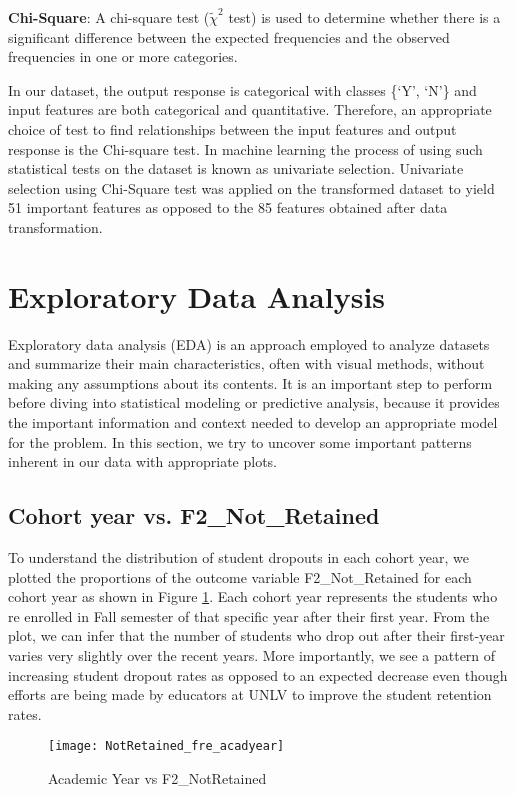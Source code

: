\documentclass[11pt,openright]{report}
\begin{document}
\noindent \textbf{Chi-Square}: A chi-square test ($\tilde{\chi}^2$ test) is used to determine whether there is a significant difference between the expected frequencies and the observed frequencies in one or more categories.

In our dataset, the output response is categorical with classes \{`Y', `N'\} and input features are both categorical and quantitative. Therefore, an appropriate choice of test to find relationships between the input features and output response is the Chi-square test. In machine learning the process of using such statistical tests on the dataset is known as univariate selection. Univariate selection using Chi-Square test was applied on the transformed dataset to yield 51 important features as opposed to the 85 features obtained after data transformation.


\section{Exploratory Data Analysis}
Exploratory data analysis (EDA) is an approach employed to analyze datasets and summarize their main characteristics, often with visual methods, without making any assumptions about its contents. It is an important step to perform before diving into statistical modeling or predictive analysis, because it provides the important information and context needed to develop an appropriate model for the problem. In this section, we try to uncover some important patterns inherent in our data with appropriate plots.


\subsection {Cohort year vs. F2\_Not\_Retained}

To understand the distribution of student dropouts in each cohort year, we plotted the proportions of the outcome variable F2\_Not\_Retained for each cohort year as shown in Figure \ref{fig:AcadYear_F2NotRetained_plot}. Each cohort year represents the students who re enrolled in Fall semester of that specific year after their first year. From the plot, we can infer that the number of students who drop out after their first-year varies very slightly over the recent years. More importantly, we see a pattern of increasing student dropout rates as opposed to an expected decrease even though efforts are being made by educators at UNLV to improve the student retention rates.


\begin{figure}[!htb]
	\centering
	\texttt{[image: NotRetained\_fre\_acadyear]}
	\caption{Academic Year vs F2\_NotRetained}
	\label{fig:AcadYear_F2NotRetained_plot}
\end{figure}
\end{document}
